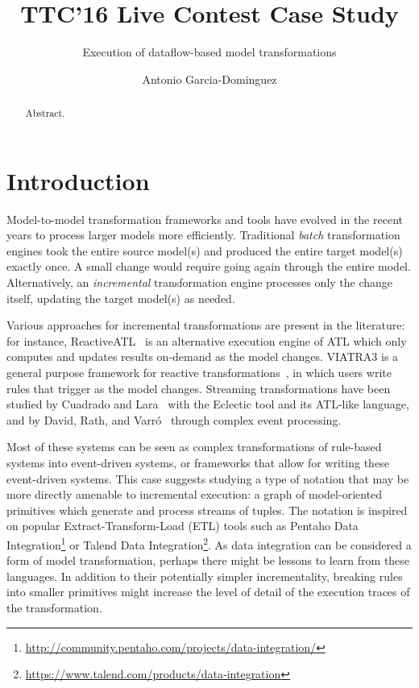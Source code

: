 \documentclass[a4paper]{scrartcl}
\title{TTC'16 Live Contest Case Study}
\subtitle{Execution of dataflow-based model transformations}
\author{Antonio Garcia-Dominguez}
\affil{\small Aston University, Birmingham, UK \\ \texttt{a.garcia-dominguez@aston.ac.uk}}
\date{}
\begin{document}
\maketitle

\begin{abstract}
  Abstract.
\end{abstract}

\section{Introduction}
\label{sec:intro}

Model-to-model transformation frameworks and tools have evolved in the
recent years to process larger models more efficiently. Traditional
\emph{batch} transformation engines took the entire source model(s)
and produced the entire target model(s) exactly once. A small change
would require going again through the entire model. Alternatively, an
\emph{incremental} transformation engine processes only the change
itself, updating the target model(s) as needed.

Various approaches for incremental transformations are present in the
literature: for instance, ReactiveATL~\cite{tisi_lazy_2011} is an
alternative execution engine of ATL which only computes and updates
results on-demand as the model changes. VIATRA3 is a general purpose
framework for reactive transformations~\cite{bergmann_viatra_2015}, in
which users write rules that trigger as the model changes.
Streaming transformations have been studied by Cuadrado and
Lara~\cite{cuadrado_streaming_2013} with the Eclectic tool and its
ATL-like language, and by David, Rath, and
Varró~\cite{david_streaming_2014} through complex event processing.

Most of these systems can be seen as complex transformations of
rule-based systems into event-driven systems, or frameworks that allow
for writing these event-driven systems. This case suggests studying a
type of notation that may be more directly amenable to incremental
execution: a graph of model-oriented primitives which generate and
process streams of tuples. The notation is inspired on popular
Extract-Transform-Load (ETL) tools such as Pentaho Data
Integration\footnote{\url{http://community.pentaho.com/projects/data-integration/}}
or Talend Data
Integration\footnote{\url{https://www.talend.com/products/data-integration}}. As
data integration can be considered a form of model transformation,
perhaps there might be lessons to learn from these languages. In
addition to their potentially simpler incrementality, breaking rules
into smaller primitives might increase the level of detail of the
execution traces of the transformation.
\end{document}
